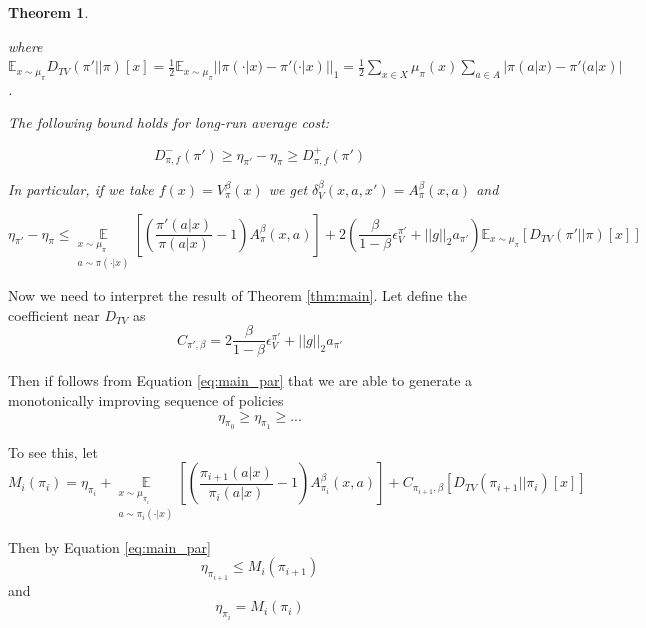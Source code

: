 \documentclass[11pt]{article}
\newcommand{\E}{\mathbb{E}}
\newtheorem{theorem}{Theorem}
\theoremstyle{definition}
\numberwithin{equation}{section}
\begin{document}
\begin{theorem}
\begin{itemize}
  where $\E_{x\sim \mu_{\pi}} D_{TV}(\pi'||\pi)[x] = \frac{1}{2}\E_{x\sim \mu_{\pi}} || \pi(\cdot|x) - \pi'(\cdot|x) ||_1 =\frac{1}{2} \sum\limits_{x\in X} \mu_\pi(x) \sum\limits_{a\in A}| \pi(a|x) - \pi'(a|x)|$.
\end{itemize}


The following bound holds for long-run average cost:

\begin{equation}\label{eq_main}
D_{\pi, f}^{-} (\pi')\geq \eta_{\pi'} - \eta_\pi\geq D_{\pi, f}^{+} (\pi')
\end{equation}

In particular, if we take $f(x) = V^\beta_\pi(x)$ we get $\delta_V^\beta(x, a, x') = A^\beta_\pi(x, a)$ and


\begin{equation}\label{eq:main_par}
 \eta_{\pi'} - \eta_\pi\leq \underset{\substack{ x\sim \mu_\pi\\ a\sim \pi(\cdot|x)}}{\E}\left[\left( \frac{\pi'(a| x)}{\pi(a|x)}-1 \right)A^\beta_\pi(x, a) \right] + 2\left(\frac{\beta}{1-\beta}\epsilon_V^{\pi'} +  ||g||_2 a_{\pi'}\right) \E_{x\sim \mu_\pi}[D_{TV}(\pi'||\pi)[x]]
\end{equation}

\end{theorem}





Now we need to  interpret the result of Theorem \ref{thm:main}.
Let define the coefficient near $D_{TV}$ as
\begin{equation}
C_{\pi',\beta}  = 2\frac{\beta}{1-\beta}\epsilon_V^{\pi'} +  ||g||_2 a_{\pi'}
\end{equation}

Then if follows from Equation \ref{eq:main_par} that we are able to  generate a monotonically improving sequence of policies
$$
\eta_{\pi_0}\geq \eta_{\pi_1}\geq ...
$$

To see this, let
\begin{equation}
M_i(\pi_i) = \eta_{\pi_i} + \underset{\substack{ x\sim \mu_{\pi_i}\\ a\sim {\pi_i}(\cdot|x)}}{\E}\left[\left( \frac{\pi_{i+1}(a| x)}{\pi_i(a|x)}-1 \right)A^\beta_{\pi_i}(x, a) \right] + C_{\pi_{i+1}, \beta}[D_{TV}(\pi_{i+1}||\pi_i)[x]]
\end{equation}

 Then by Equation \ref{eq:main_par}
$$
\eta_{\pi_{i+1}} \leq M_i(\pi_{i+1})
$$
and
$$
\eta_{\pi_{i}} = M_i(\pi_{i})
$$
\end{document}
